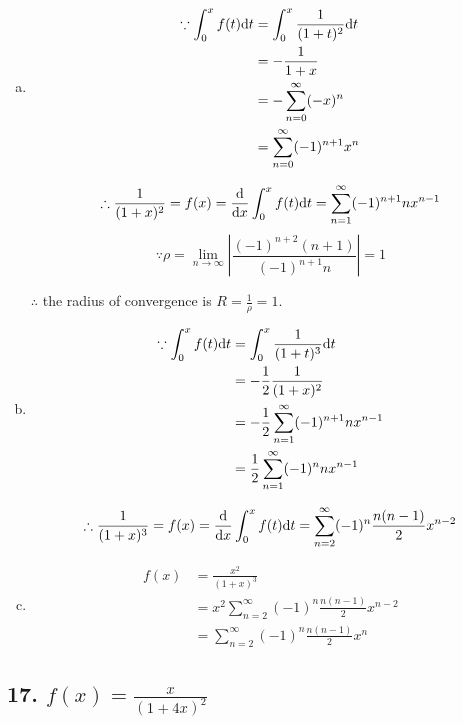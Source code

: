 \documentclass{article}
\begin{document}
    \begin{enumerate}[(a)]
        \item 
        $$\begin{aligned}
            \because \int_0^x f(t) \textrm dt &= \int_0^x \frac{1}{(1+t)^2} \textrm dt \\
            &= -\frac{1}{1+x} \\
            &= -\sum_{n=0}^\infty(-x)^n \\
            &= \sum_{n=0}^\infty (-1)^{n+1}x^n \\
        \end{aligned}$$

        $$\therefore \frac{1}{(1+x)^2} = f(x) = \frac{\textrm d}{\textrm dx}\int_0^x f(t)\textrm dt = \sum_{n=1}^\infty (-1)^{n+1}nx^{n-1}$$
        $$\because \rho = \lim_{n\to\infty}|\frac{(-1)^{n+2}(n+1)}{(-1)^{n+1}n}| = 1$$

        $\therefore$ the radius of convergence is $R = \frac 1 \rho = 1$.

        \item
        $$\begin{aligned}
            \because \int_0^x f(t) \textrm dt &= \int_0^x \frac{1}{(1+t)^3} \textrm dt \\
            &= -\frac 1 2\frac{1}{(1+x)^2} \\
            &= -\frac 1 2 \sum_{n=1}^\infty (-1)^{n+1}nx^{n-1} \\
            &= \frac 1 2 \sum_{n=1}^\infty (-1)^n nx^{n-1} \\
        \end{aligned}$$

        $$\therefore \frac{1}{(1+x)^3} = f(x) = \frac{\textrm d}{\textrm dx}\int_0^x f(t)\textrm dt =\sum_{n=2}^\infty (-1)^n \frac{n(n-1)}{2} x^{n-2}$$

        \item 
        $$\begin{aligned}
            f(x) &= \frac{x^2}{(1+x)^3} \\
            &= x^2 \sum_{n=2}^\infty (-1)^n \frac{n(n-1)}{2} x^{n-2} \\
            &= \sum_{n=2}^\infty (-1)^n \frac{n(n-1)}{2}x^n
        \end{aligned}$$

    \end{enumerate}

    \subsection*{17. $f(x) = \frac{x}{(1+4x)^2}$}
\end{document}
